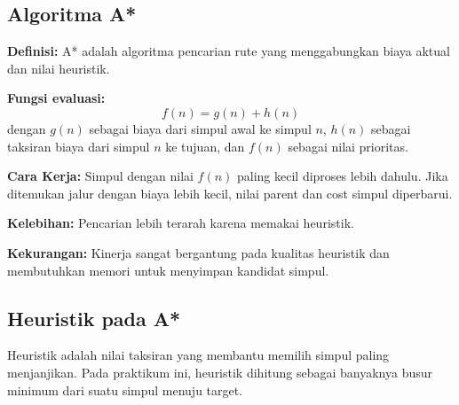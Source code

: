 \subsection{Algoritma A*}
\textbf{Definisi:} A* adalah algoritma pencarian rute yang menggabungkan biaya aktual dan nilai heuristik.

\textbf{Fungsi evaluasi:}
\[
    f(n) = g(n) + h(n)
\]
dengan $g(n)$ sebagai biaya dari simpul awal ke simpul $n$, $h(n)$ sebagai taksiran biaya dari simpul $n$ ke tujuan, dan $f(n)$ sebagai nilai prioritas.

\textbf{Cara Kerja:} Simpul dengan nilai $f(n)$ paling kecil diproses lebih dahulu. Jika ditemukan jalur dengan biaya lebih kecil, nilai parent dan cost simpul diperbarui.

\textbf{Kelebihan:} Pencarian lebih terarah karena memakai heuristik.

\textbf{Kekurangan:} Kinerja sangat bergantung pada kualitas heuristik dan membutuhkan memori untuk menyimpan kandidat simpul.

\subsection{Heuristik pada A*}
Heuristik adalah nilai taksiran yang membantu memilih simpul paling menjanjikan. Pada praktikum ini, heuristik dihitung sebagai banyaknya busur minimum dari suatu simpul menuju target.
